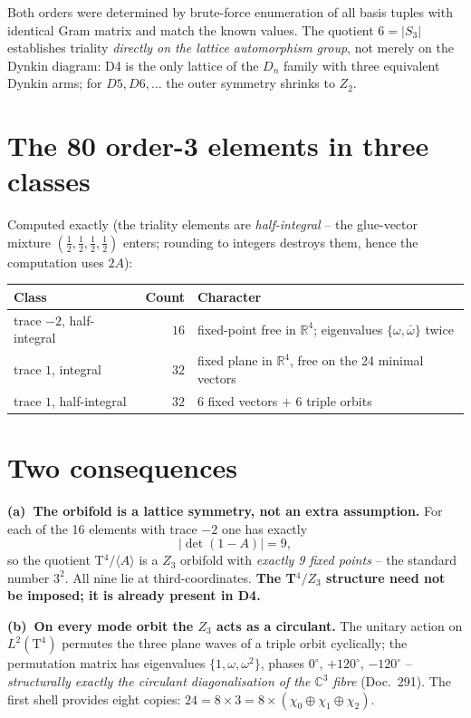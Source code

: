 Both orders were determined by brute-force enumeration of all basis
tuples with identical Gram matrix and match the known values. The
quotient $6 = |S_3|$ establishes triality \emph{directly on the
lattice automorphism group}, not merely on the Dynkin diagram: D4 is
the only lattice of the $D_n$ family with three equivalent Dynkin
arms; for $D5, D6, \dots$ the outer symmetry shrinks to $Z_2$.

\section{The 80 order-3 elements in three classes}

Computed exactly (the triality elements are \emph{half-integral} --
the glue-vector mixture $(\frac12,\frac12,\frac12,\frac12)$ enters;
rounding to integers destroys them, hence the computation uses
$2A$):

\begin{center}
\begin{tabular}{lrl}
\toprule
Class & Count & Character \\
\midrule
trace $-2$, half-integral & $16$ & fixed-point free in
  $\mathbb{R}^4$; eigenvalues $\{\omega,\bar\omega\}$ twice \\
trace $1$, integral & $32$ & fixed plane in $\mathbb{R}^4$,
  free on the 24 minimal vectors \\
trace $1$, half-integral & $32$ & 6 fixed vectors $+$ 6 triple
  orbits \\
\bottomrule
\end{tabular}
\end{center}

\section{Two consequences}

\textbf{(a)~The orbifold is a lattice symmetry, not an extra
assumption.} For each of the 16 elements with trace $-2$ one has
exactly
\begin{equation}
  |\det(1-A)| = 9,
\end{equation}
so the quotient T$^4/\langle A\rangle$ is a $Z_3$ orbifold with
\emph{exactly 9 fixed points} -- the standard number $3^2$. All nine
lie at third-coordinates. \textbf{The T$^4/Z_3$ structure need not
be imposed; it is already present in D4.}

\textbf{(b)~On every mode orbit the $Z_3$ acts as a circulant.} The
unitary action on $L^2(\text{T}^4)$ permutes the three plane waves
of a triple orbit cyclically; the permutation matrix has eigenvalues
$\{1,\omega,\omega^2\}$, phases $0^\circ$, $+120^\circ$,
$-120^\circ$ -- \emph{structurally exactly the circulant
diagonalisation of the $\mathbb{C}^3$ fibre} (Doc.~291). The first
shell provides eight copies: $24 = 8\times3
= 8\times(\chi_0\oplus\chi_1\oplus\chi_2)$.

